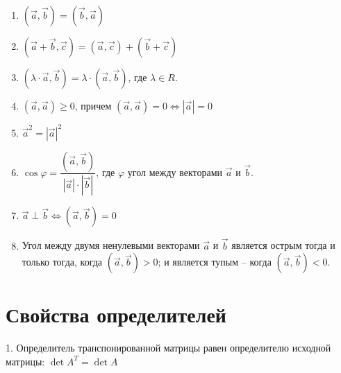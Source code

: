 \documentclass[a4paper,12pt]{extbook}
\theoremstyle{named}
\theoremstyle{named}
\begin{document}
\begin{enumerate}
    \item \((\overrightarrow{a}, \overrightarrow{b}) = (\overrightarrow{b}, \overrightarrow{a})\)

    \item \((\overrightarrow{a} + \overrightarrow{b}, \overrightarrow{c}) = (\overrightarrow{a}, \overrightarrow{c}) + (\overrightarrow{b} + \overrightarrow{c})\)

    \item \((\lambda \cdot \overrightarrow{a}, \overrightarrow{b}) = \lambda \cdot (\overrightarrow{a}, \overrightarrow{b})\), где \(\lambda \in R\).

    \item \((\overrightarrow{a}, \overrightarrow{a}) \geq 0\), причем \((\overrightarrow{a}, \overrightarrow{a}) = 0 \iff |\overrightarrow{a}| = 0\)

    \item \(\overrightarrow{a}^2 = |\overrightarrow{a}|^2\)

    \item \(\cos{\varphi} = \dfrac{(\overrightarrow{a}, \overrightarrow{b})}{|\overrightarrow{a}| \cdot |\overrightarrow{b}|}\), где \(\varphi\) угол между векторами \(\overrightarrow{a}\) и \(\overrightarrow{b}\).

    \item \(\overrightarrow{a} \perp \overrightarrow{b} \iff (\overrightarrow{a}, \overrightarrow{b}) = 0\)

    \item Угол между двумя ненулевыми векторами \(\overrightarrow{a}\) и \(\overrightarrow{b}\) является острым тогда и только тогда, когда \((\overrightarrow{a}, \overrightarrow{b}) > 0\); и является тупым – когда \((\overrightarrow{a}, \overrightarrow{b}) < 0\).
\end{enumerate}



\section{Свойства определителей}\label{sec:det}

1. Определитель транспонированной матрицы равен определителю исходной матрицы: \(\det A^T = \det A\)
\end{document}
